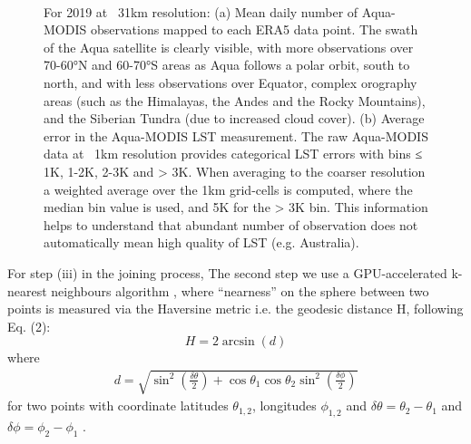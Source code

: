 \documentclass[hess, twostagejnl]{copernicus}
\begin{document}
\begin{figure}
	 \\
	\caption{For 2019 at ~31km resolution: (a) Mean daily number of Aqua-MODIS observations mapped to each ERA5 data point. The swath of the Aqua satellite is clearly visible, with more observations over 70-60°N and 60-70°S areas as Aqua follows a polar orbit, south to north, and with less observations over Equator, complex orography areas (such as the Himalayas, the Andes and the Rocky Mountains), and the Siberian Tundra (due to increased cloud cover). (b) Average error in the Aqua-MODIS LST measurement. The raw Aqua-MODIS data at ~1km resolution provides categorical LST errors with bins ≤ 1K, 1-2K, 2-3K and > 3K. When averaging to the coarser resolution a weighted average over the 1km grid-cells is computed, where the median bin value is used, and 5K for the > 3K bin. This information helps to understand that abundant number of observation does not automatically mean high quality of LST (e.g. Australia).} 
	\label{fig:MODIS_time_error_N}
\end{figure}
\noindent For step (iii) in the joining process, The second step we use a GPU-accelerated k-nearest neighbours algorithm \cite{Rapids}, where “nearness” on the sphere between two points is measured via the Haversine metric i.e. the geodesic distance H, following Eq. (2):
\begin{equation}
	H = 2 \arcsin (d)
\end{equation}
where
\begin{eqnarray}
	d = \sqrt{\sin^2\left(\frac{\delta\theta}{2}\right) + \cos \theta_1 \cos \theta_2 \sin^2\left(\frac{\delta \phi}{2}\right) }
\end{eqnarray} 
for two points with coordinate latitudes $\theta_{1,2}$, longitudes $\phi_{1,2}$ and $\delta \theta = \theta_2 - \theta_1$ and  $\delta \phi = \phi_2 - \phi_1$ . 
\end{document}
